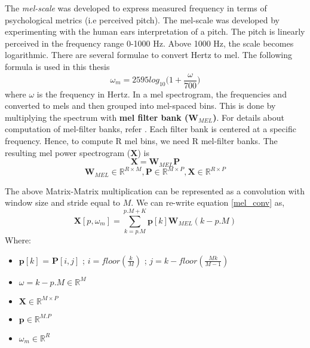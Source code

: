 The \textit{mel-scale} was developed to express measured frequency in terms of psychological metrics (i.e perceived pitch). The mel-scale was developed
by experimenting with the human ears interpretation of a pitch. The pitch is linearly perceived in the frequency range 0-1000 Hz. Above
1000 Hz, the scale becomes logarithmic. There are several formulae to convert Hertz to mel. The following formula is used in this thesis\cite{speech}
\begin{equation}
\omega_{m} = 2595log_{10}\bigg(1+\frac{ \omega }{700}\bigg)
\end{equation}
where $\omega$ is the frequency in Hertz. In a mel spectrogram, the frequencies and converted to mels and then grouped into mel-spaced bins. This is done by multiplying the spectrum with \textbf{mel filter bank ($\textbf{W}_{MEL}$)}. For details about computation of mel-filter banks, refer \cite{mel}. Each filter bank is centered at a specific frequency. Hence, to compute R mel bins, we need R mel-filter banks. The resulting mel power spectrogram ($\textbf{X}$) is
\begin{equation}
\label{mel_conv}
\textbf{X} = \textbf{W}_{MEL}\textbf{P}
\end{equation}
\[
 \textbf{W}_{MEL} \in  \mathbb{R}^{R \times M}, \textbf{P} \in \mathbb{R}^{M \times P}, \textbf{X} \in \mathbb{R}^{R \times P}
\]

\noindent The above Matrix-Matrix multiplication can be represented as a convolution with window size and stride equal to $M$. We can re-write equation \ref{mel_conv} as, 
\begin{equation}
\label{mel_conv_flat}
\textbf{X}[p,\omega_{m}] = \displaystyle\sum_{k=p.M}^{p.M + K}\textbf{p}[k]\textbf{W}_{MEL}(k-p.M)
\end{equation}
Where:
\begin{itemize}[label=]
    \setlength\itemsep{0em}
    \item $\textbf{p}[k]$ = $\textbf{P}[i,j]$ ; $i = floor(\frac{k}{M})$ ; $j = k-floor(\frac{Mk}{M-1})$
    \item $\omega = k-p.M \in \mathbb{R}^{M}$
    \item $\textbf{X} \in \mathbb{R}^{M \times P}$
    \item $\textbf{p} \in \mathbb{R}^{M.P}$
    \item $\omega_{m} \in  \mathbb{R}^{R}$
\end{itemize}

